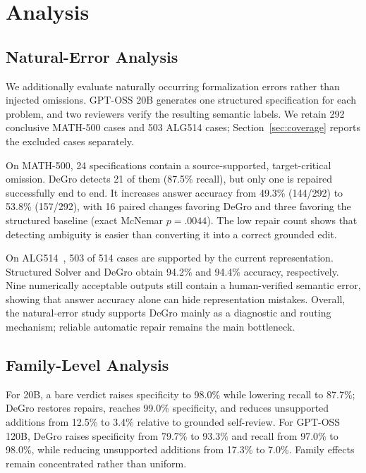 \documentclass[sigconf,anonymous]{aamas}
\begin{document}
\section{Analysis}
\subsection{Natural-Error Analysis}
We additionally evaluate naturally occurring formalization errors rather than injected omissions. GPT-OSS 20B generates one structured specification for each problem, and two reviewers verify the resulting semantic labels. We retain 292 conclusive MATH-500 cases and 503 ALG514 cases; Section~\ref{sec:coverage} reports the excluded cases separately.

On MATH-500, 24 specifications contain a source-supported, target-critical omission. DeGro detects 21 of them (87.5\% recall), but only one is repaired successfully end to end. It increases answer accuracy from 49.3\% (144/292) to 53.8\% (157/292), with 16 paired changes favoring DeGro and three favoring the structured baseline (exact McNemar $p=.0044$). The low repair count shows that detecting ambiguity is easier than converting it into a correct grounded edit.

On ALG514~\cite{upadhyay2017derivations}, 503 of 514 cases are supported by the current representation. Structured Solver and DeGro obtain 94.2\% and 94.4\% accuracy, respectively. Nine numerically acceptable outputs still contain a human-verified semantic error, showing that answer accuracy alone can hide representation mistakes. Overall, the natural-error study supports DeGro mainly as a diagnostic and routing mechanism; reliable automatic repair remains the main bottleneck.



\subsection{Family-Level Analysis}
For 20B, a bare verdict raises specificity to 98.0\% while lowering recall to 87.7\%; DeGro restores repairs, reaches 99.0\% specificity, and reduces unsupported additions from 12.5\% to 3.4\% relative to grounded self-review.  For GPT-OSS 120B, DeGro raises specificity from 79.7\% to 93.3\% and recall from 97.0\% to 98.0\%, while reducing unsupported additions from 17.3\% to 7.0\%.  Family effects remain concentrated rather than uniform.
\end{document}
